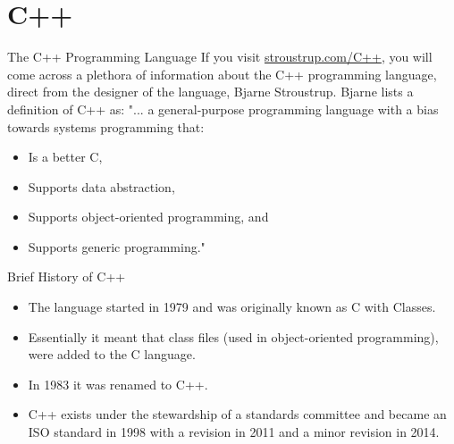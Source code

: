\documentclass[../lecture1-introduction.tex]{subfiles}
\begin{document}
\section{C++}


\begin{frame}[fragile]{The C++ Programming Language}
    If you visit \href{http://www.stroustrup.com/C++.html}{stroustrup.com/C++},
    you will come across a plethora of information about the C++ programming
    language, direct from the designer of the language, Bjarne Stroustrup. \newline
    \newline
    Bjarne lists a definition of C++ as: \newline \newline
    "... a general-purpose programming language with a bias towards systems
    programming that:
    \begin{itemize}
        \item Is a better C,
        \item Supports data abstraction,
        \item Supports object-oriented programming, and
        \item Supports generic programming."
    \end{itemize}
\end{frame}


\begin{frame}[fragile]{Brief History of C++}
    \begin{itemize}
        \item The language started in 1979 and was originally known as C with Classes. \pause
        \item Essentially it meant that class files (used in object-oriented
        programming), were added to the C language. \pause
        \item In 1983 it was renamed to C++. \pause
        \item C++ exists under the stewardship of a standards committee and
        became an ISO standard in 1998 with a revision in 2011 and a minor
        revision in 2014. \pause
    \end{itemize}
\end{frame}

\end{document}
